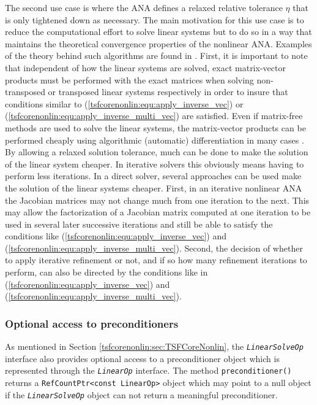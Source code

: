 The second use case is where the ANA defines a relaxed relative tolerance
$\eta$ that is only tightened down as necessary.  The main
motivation for this use case is to reduce the computational effort to
solve linear systems but to do so in a way that maintains the
theoretical convergence properties of the nonlinear ANA.  Examples of
the theory behind such algorithms are found in
\cite{JEDennis_MHeinkenschloss_LNVicente_1998}.  First, it is
important to note that independent of how the linear systems are
solved, exact matrix-vector products must be performed with the exact
matrices when solving non-transposed or transposed linear systems
respectively in order to insure that conditions similar to
(\ref{tsfcorenonlin:equ:apply_inverse_vec}) or
(\ref{tsfcorenonlin:equ:apply_inverse_multi_vec}) are satisfied.  Even
if matrix-free methods are used to solve the linear systems, the
matrix-vector products can be performed cheaply using algorithmic
(automatic) differentiation in many cases \cite{ref:adolc_1996}.  By
allowing a relaxed solution tolerance, much can be done to make the
solution of the linear system cheaper.  In iterative solvers this
obviously means having to perform less iterations.  In a direct
solver, several approaches can be used make the solution of the linear
systems cheaper.  First, in an iterative nonlinear ANA the Jacobian
matrices may not change much from one iteration to the next.  This may
allow the factorization of a Jacobian matrix computed at one iteration
to be used in several later successive iterations and still be able to
satisfy the conditions like
(\ref{tsfcorenonlin:equ:apply_inverse_vec}) and
(\ref{tsfcorenonlin:equ:apply_inverse_multi_vec}).  Second, the
decision of whether to apply iterative refinement or not, and if so
how many refinement iterations to perform, can also be directed by the
conditions like in (\ref{tsfcorenonlin:equ:apply_inverse_vec}) and
(\ref{tsfcorenonlin:equ:apply_inverse_multi_vec}).

%
\subsubsection{Optional access to preconditioners}
\label{tsfcorenonlin:sec:preconditioners}
%

As mentioned in Section \ref{tsfcorenonlin:sec:TSFCoreNonlin}, the
\texttt{\textit{Linear\-Solve\-Op}} interface also provides
optional access to a preconditioner object which is represented
through the \texttt{\textit{LinearOp}} interface.  The
method \texttt{pre\-conditioner()} returns a
\texttt{RefCountPtr<const LinearOp>} object which may
point to a null object if the \texttt{\textit{Linear\-Solve\-Op}}
object can not return a meaningful preconditioner.

